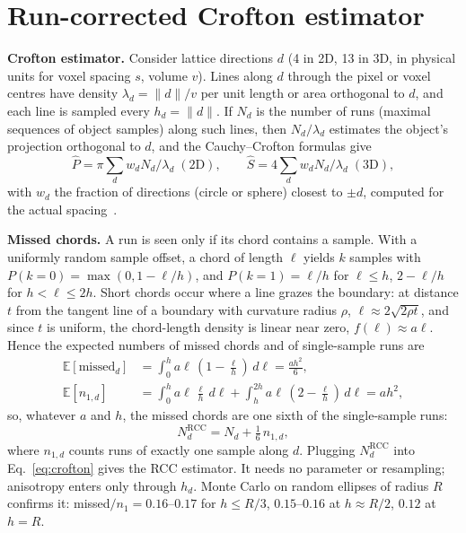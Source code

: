 \documentclass{article}
\begin{document}
\section{Run-corrected Crofton estimator}
\label{sec:rcc}
\noindent\textbf{Crofton estimator.} Consider lattice directions $d$ (4 in 2D, 13 in 3D, in physical units for voxel spacing $s$, volume $v$). Lines along $d$ through the pixel or voxel centres have density $\lambda_d=\lVert d\rVert/v$ per unit length or area orthogonal to $d$, and each line is sampled every $h_d=\lVert d\rVert$. If $N_d$ is the number of runs (maximal sequences of object samples) along such lines, then $N_d/\lambda_d$ estimates the object's projection orthogonal to $d$, and the Cauchy--Crofton formulas give
\begin{equation}
\hat P=\pi\textstyle\sum_d w_d N_d/\lambda_d \;(2\text{D}),\qquad \hat S=4\sum_d w_d N_d/\lambda_d \;(3\text{D}),
\label{eq:crofton}
\end{equation}
with $w_d$ the fraction of directions (circle or sphere) closest to $\pm d$, computed for the actual spacing~\cite{legland2007,legland2016}.

\noindent\textbf{Missed chords.} A run is seen only if its chord contains a sample. With a uniformly random sample offset, a chord of length $\ell$ yields $k$ samples with $P(k{=}0)=\max(0,1-\ell/h)$, and $P(k{=}1)=\ell/h$ for $\ell\le h$, $2-\ell/h$ for $h<\ell\le2h$. Short chords occur where a line grazes the boundary: at distance $t$ from the tangent line of a boundary with curvature radius $\rho$, $\ell\approx2\sqrt{2\rho t}$, and since $t$ is uniform, the chord-length density is linear near zero, $f(\ell)\approx a\ell$. Hence the expected numbers of missed chords and of single-sample runs are
\begin{align}
\mathbb{E}[\text{missed}_d]&=\textstyle\int_0^{h}a\ell\,(1-\tfrac{\ell}{h})\,d\ell=\tfrac{ah^2}{6},\nonumber\\
\mathbb{E}[n_{1,d}]&=\textstyle\int_0^{h}a\ell\,\tfrac{\ell}{h}\,d\ell+\int_h^{2h}a\ell\,(2-\tfrac{\ell}{h})\,d\ell=ah^2,
\end{align}
so, whatever $a$ and $h$, the missed chords are one sixth of the single-sample runs:
\begin{equation}
N_d^{\text{RCC}}=N_d+\tfrac16\,n_{1,d},
\label{eq:rcc}
\end{equation}
where $n_{1,d}$ counts runs of exactly one sample along $d$. Plugging $N_d^{\text{RCC}}$ into Eq.~\eqref{eq:crofton} gives the RCC estimator. It needs no parameter or resampling; anisotropy enters only through $h_d$. Monte Carlo on random ellipses of radius $R$ confirms it: missed$/n_1=0.16$--$0.17$ for $h\le R/3$, $0.15$--$0.16$ at $h\approx R/2$, $0.12$ at $h=R$.
\end{document}
